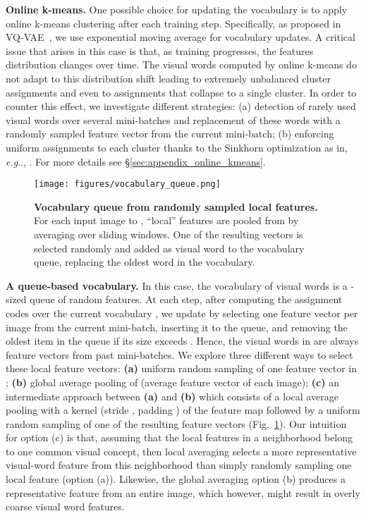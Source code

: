 \documentclass[final]{cvpr}
\makeatletter
\DeclareRobustCommand\onedot{\futurelet\@let@token\@onedot}
\def\@onedot{\ifx\@let@token.\else.\null\fi\xspace}
\def\eg{\emph{e.g}\onedot} \def\Eg{\emph{E.g}\onedot}
\makeatother
\begin{document}
\textbf{Online k-means.}
One possible choice for updating the vocabulary is to apply online k-means clustering after each training step. Specifically, as proposed in VQ-VAE~\cite{oord2017neural, razavi2019generating}, we use exponential moving average for vocabulary updates.
A critical issue that arises in this case is that, as training progresses, the features distribution changes over time. The visual words computed by online k-means do not adapt to this distribution shift leading to extremely unbalanced cluster assignments and even to assignments that collapse to a single cluster. In order to counter this effect, we investigate different strategies: (a) detection of rarely used visual words over several mini-batches and replacement of these words with a randomly sampled feature vector from the current mini-batch; (b) enforcing uniform assignments to each cluster thanks to the Sinkhorn optimization as in, \eg, \cite{asano2019selflabelling,caron2020unsupervised}. 
For more details see \S\ref{sec:appendix_online_kmeans}.


\begin{figure}[t!]
\renewcommand{\captionfont}{\small}
\renewcommand{\captionlabelfont}{\bf}
\centering
\texttt{[image: figures/vocabulary\_queue.png]}
\vspace{-10pt}
\caption{\textbf{Vocabulary queue from randomly sampled local features.} For each input image  to  , ``local'' features are pooled from  by averaging over  sliding windows. One of the resulting vectors is selected randomly and added as visual word to the vocabulary queue, replacing the oldest word in the vocabulary.}
\label{fig:vocabulary_queue}
\end{figure}


\textbf{A queue-based vocabulary.} 
In this case, the vocabulary  of visual words is a -sized queue of random features.
At each step, after computing the assignment codes
over the current vocabulary , we update  by selecting one feature vector per image from the current mini-batch, inserting it to the queue, and removing the oldest item in the queue if its size exceeds . Hence, the visual words in  are always feature vectors from past mini-batches. 
We explore three different ways to select these local feature vectors:
\textbf{(a)} uniform random sampling of one feature vector in ; 
\textbf{(b)} global average pooling of  (average feature vector of each image);
\textbf{(c)} an intermediate approach between \textbf{(a)} and \textbf{(b)} which consists of a local average pooling with a  kernel (stride , padding ) of the feature map  followed by a uniform random sampling of one of the resulting feature vectors (Fig.~\ref{fig:vocabulary_queue}).
Our intuition for option (c) is that, 
assuming that the local features in a  neighborhood belong to one common visual concept,
then local averaging selects a more representative visual-word feature from this neighborhood than simply randomly sampling one local feature (option (a)).
Likewise, the global averaging option (b) produces a representative feature from an entire image, which however, might result in overly coarse visual word features.
\end{document}

